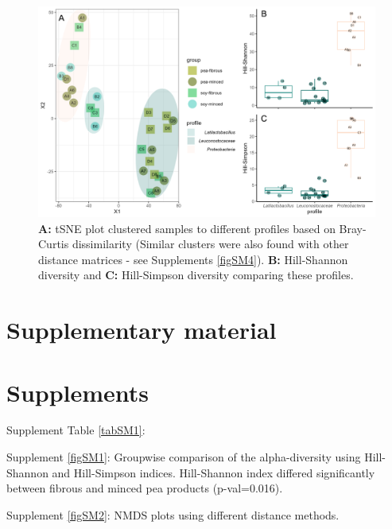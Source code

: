 \documentclass[preprint, 3p,
authoryear]{elsarticle} %
\newcommand{\beginsupplement}{ \setcounter{table}{0} \renewcommand{\thetable}{S\arabic{table}} \setcounter{figure}{0} \renewcommand{\thefigure}{S\arabic{figure}} }
\begin{document}
\begin{figure}

{\centering \includegraphics[width=1\linewidth]{Fig3profiles} 

}

\caption{\label{fig3} \textbf {A:} tSNE plot clustered samples to different profiles based on Bray-Curtis dissimilarity (Similar clusters were also found with other distance matrices - see Supplements \ref{figSM4}). \textbf {B:} Hill-Shannon diversity and \textbf {C:} Hill-Simpson diversity comparing these profiles. }\label{fig:fig3}
\end{figure}

\newpage

\hypertarget{supplementary-material}{%
\section*{Supplementary material}\label{supplementary-material}}

\beginsupplement

\hypertarget{supplements}{%
\section{Supplements}\label{supplements}}

Supplement Table \ref{tabSM1}:

Supplement \ref{figSM1}: Groupwise comparison of the alpha-diversity
using Hill-Shannon and Hill-Simpson indices. Hill-Shannon index differed
significantly between fibrous and minced pea products (p-val=0.016).

Supplement \ref{figSM2}: NMDS plots using different distance methods.
\end{document}
